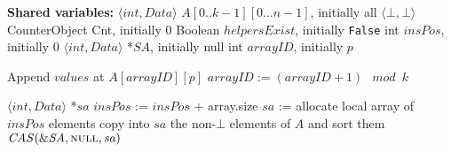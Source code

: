 \documentclass[a4paper,11pt,twoside,openany]{book}
\newcommand{\NULL}{\mbox{\sc null}}
\newcommand{\False}{\mbox{\texttt{False}}}
\begin{document}
\begin{algorithm}[t]
    \footnotesize
    \begin{algorithmic}[1]
        \State \textbf{Shared variables:}
        \State $\mathit{\langle int, Data \rangle}$ $A[0..k-1][0...n-1]$, initially all $\langle \bot, \bot \rangle$
        \State CounterObject Cnt, initially $0$
        \State Boolean $\mathit{helpersExist}$, initially \False
        \State int $\mathit{insPos}$, initially $0$
        \State $\mathit{\langle int, Data \rangle}$ *$\mathit{SA}$, initially \NULL
        \State int $\mathit{arrayID}$, initially $p$

            \State Append $\mathit{values}$ at $\mathit{A[arrayID][p]}$ \label{alg:pq:ins:store:dynamic}
            \State $\mathit{arrayID := (arrayID+1) \mod k}$
        \EndProcedure

            \State $\mathit{\langle int, Data \rangle}$ *$\mathit{sa}$
                    \State $\mathit{insPos}$ := $\mathit{insPos}$ + array.size
                \EndIf
            \EndFor
            \State $\mathit{sa}$ := allocate local array of $insPos$ elements
            \State copy into $\mathit{sa}$ the non-$\bot$ elements of $A$ and sort them \label{alg:sa:local-copy-dynamic}
            \State $\mathit{CAS(\&SA, \NULL, sa)}$ \label{alg:sa:CAS-dynamic}
        \EndProcedure


\end{algorithmic}
\end{algorithm}
\end{document}
